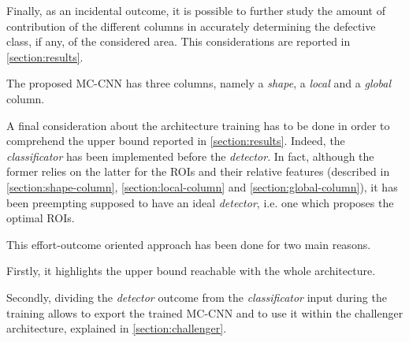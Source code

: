     \par{
        Finally, as an incidental outcome, it is possible to further study the amount of contribution of the different columns in accurately determining the defective class, if any, of the considered area. This considerations are reported in \ref{section:results}.
    }
    \par{
        The proposed MC-CNN has three columns, namely a \emph{shape}, a \emph{local} and a \emph{global} column.
    }
    \par{
        A final consideration about the architecture training has to be done in order to comprehend the upper bound reported in \ref{section:results}. Indeed, the \emph{classificator} has been implemented before the \emph{detector}. In fact, although the former relies on the latter for the ROIs and their relative features (described in \ref{section:shape-column}, \ref{section:local-column} and \ref{section:global-column}), it has been preempting supposed to have an ideal \emph{detector}, i.e. one which proposes the optimal ROIs.
    }
    \par{
        This effort-outcome oriented approach has been done for two main reasons.
    }
    \par{
        Firstly, it highlights the upper bound reachable with the whole architecture.
    }
    \par{
        Secondly, dividing the \emph{detector} outcome from the \emph{classificator} input during the training allows to export the trained MC-CNN and to use it within the challenger architecture, explained in \ref{section:challenger}.
    }

